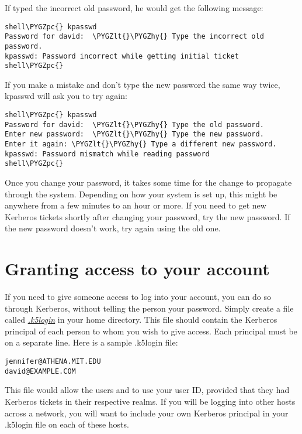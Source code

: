 \documentclass[letterpaper,10pt,english]{sphinxmanual}
\def\PYGZlt{\char`\<}
\def\PYGZpc{\char`\%}
\def\PYGZhy{\char`\-}
\begin{document}
If  typed the incorrect old password, he would get the
following message:

\begin{Verbatim}[commandchars=\\\{\}]
shell\PYGZpc{} kpasswd
Password for david:  \PYGZlt{}\PYGZhy{} Type the incorrect old password.
kpasswd: Password incorrect while getting initial ticket
shell\PYGZpc{}
\end{Verbatim}

If you make a mistake and don't type the new password the same way
twice, kpasswd will ask you to try again:

\begin{Verbatim}[commandchars=\\\{\}]
shell\PYGZpc{} kpasswd
Password for david:  \PYGZlt{}\PYGZhy{} Type the old password.
Enter new password:  \PYGZlt{}\PYGZhy{} Type the new password.
Enter it again: \PYGZlt{}\PYGZhy{} Type a different new password.
kpasswd: Password mismatch while reading password
shell\PYGZpc{}
\end{Verbatim}

Once you change your password, it takes some time for the change to
propagate through the system.  Depending on how your system is set up,
this might be anywhere from a few minutes to an hour or more.  If you
need to get new Kerberos tickets shortly after changing your password,
try the new password.  If the new password doesn't work, try again
using the old one.


\section{Granting access to your account}
\label{user/pwd_mgmt:grant-access}\label{user/pwd_mgmt:granting-access-to-your-account}
If you need to give someone access to log into your account, you can
do so through Kerberos, without telling the person your password.
Simply create a file called {\hyperref[user/user_config/k5login:k5login-5]{\emph{.k5login}}} in your home directory.
This file should contain the Kerberos principal of each person to whom
you wish to give access.  Each principal must be on a separate line.
Here is a sample .k5login file:

\begin{Verbatim}[commandchars=\\\{\}]
jennifer@ATHENA.MIT.EDU
david@EXAMPLE.COM
\end{Verbatim}

This file would allow the users  and  to use your
user ID, provided that they had Kerberos tickets in their respective
realms.  If you will be logging into other hosts across a network, you
will want to include your own Kerberos principal in your .k5login file
on each of these hosts.
\end{document}
